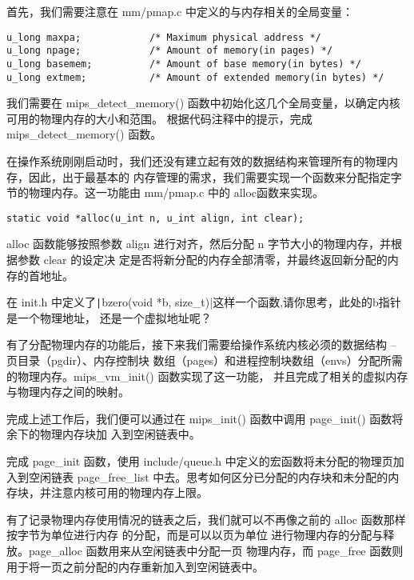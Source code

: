 首先，我们需要注意在 mm/pmap.c 中定义的与内存相关的全局变量：

\begin{verbatim}
u_long maxpa;            /* Maximum physical address */
u_long npage;            /* Amount of memory(in pages) */
u_long basemem;          /* Amount of base memory(in bytes) */
u_long extmem;           /* Amount of extended memory(in bytes) */
\end{verbatim}

\begin{exercise}
我们需要在 mips\_detect\_memory() 函数中初始化这几个全局变量，以确定内核可用的物理内存的大小和范围。
根据代码注释中的提示，完成 mips\_detect\_memory() 函数。
\end{exercise}

在操作系统刚刚启动时，我们还没有建立起有效的数据结构来管理所有的物理内存，因此，出于最基本的
内存管理的需求，我们需要实现一个函数来分配指定字节的物理内存。这一功能由 mm/pmap.c 中的
alloc函数来实现。

\begin{verbatim}
static void *alloc(u_int n, u_int align, int clear);
\end{verbatim}

alloc 函数能够按照参数 align 进行对齐，然后分配 n 字节大小的物理内存，并根据参数 clear 的设定决
定是否将新分配的内存全部清零，并最终返回新分配的内存的首地址。

\begin{thinking}\label{think-bzero}
在 init.h 中定义了\texttt|bzero(void *b, size_t)|这样一个函数,请你思考，此处的b指针是一个物理地址，
还是一个虚拟地址呢？
\end{thinking}

有了分配物理内存的功能后，接下来我们需要给操作系统内核必须的数据结构 -- 页目录（pgdir）、内存控制块
数组（pages）和进程控制块数组（envs）分配所需的物理内存。mips\_vm\_init() 函数实现了这一功能，
并且完成了相关的虚拟内存与物理内存之间的映射。

完成上述工作后，我们便可以通过在 mips\_init() 函数中调用 page\_init() 函数将余下的物理内存块加
入到空闲链表中。

\begin{exercise}
完成 page\_init 函数，使用 include/queue.h 中定义的宏函数将未分配的物理页加入到空闲链表
page\_free\_list 中去。思考如何区分已分配的内存块和未分配的内存块，并注意内核可用的物理内存上限。
\end{exercise}

有了记录物理内存使用情况的链表之后，我们就可以不再像之前的 alloc 函数那样按字节为单位进行内存
的分配，而是可以以页为单位 进行物理内存的分配与释放。page\_alloc 函数用来从空闲链表中分配一页
物理内存，而 page\_free 函数则用于将一页之前分配的内存重新加入到空闲链表中。

